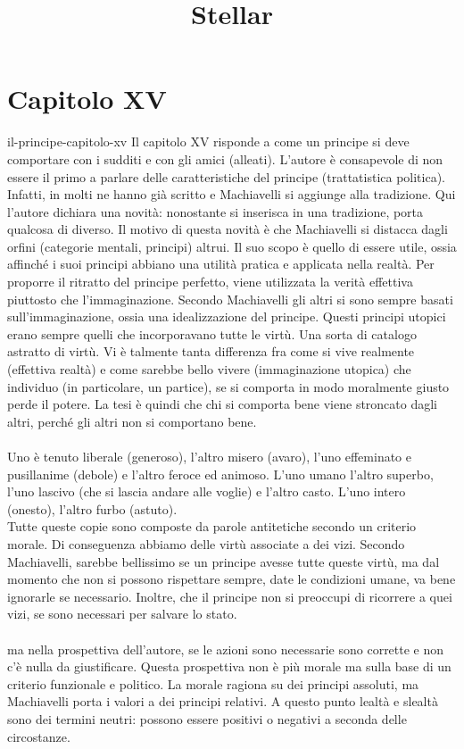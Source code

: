 \documentclass[preview]{standalone}
\begin{document}
\title{Stellar}
\genpage

\section{Capitolo XV}

\begin{snippet}{il-principe-capitolo-xv}
    Il capitolo XV risponde a come un principe si deve comportare
    con i sudditi e con gli amici (alleati).
    L'autore è consapevole di non essere il primo a parlare
    delle caratteristiche del principe (trattatistica politica).
    Infatti, in molti ne hanno già scritto e Machiavelli si
    aggiunge alla tradizione.
    Qui l'autore dichiara una novità: nonostante si inserisca in una tradizione,
    porta qualcosa di diverso.
    Il motivo di questa novità è che Machiavelli si distacca
    dagli orfini (categorie mentali, principi) altrui.
    Il suo scopo è quello di essere utile, ossia
    affinché i suoi principi abbiano una utilità pratica e applicata
    nella realtà.
    Per proporre il ritratto del principe perfetto, viene utilizzata
    la verità effettiva piuttosto che l'immaginazione.
    Secondo Machiavelli gli altri si sono sempre basati sull'immaginazione,
    ossia una idealizzazione del principe.
    Questi principi utopici erano sempre quelli che incorporavano tutte le virtù.
    Una sorta di catalogo astratto di virtù.
    Vi è talmente tanta differenza fra come si vive realmente (effettiva realtà)
    e come sarebbe bello vivere (immaginazione utopica) che
    individuo (in particolare, un partice), se si comporta in modo moralmente giusto
    perde il potere. La tesi è quindi che chi si comporta bene
    viene stroncato dagli altri, perché gli altri non si comportano bene.
    \\\\
    Uno è tenuto liberale (generoso), l'altro misero (avaro),
    l'uno effeminato e pusillanime (debole) e l'altro
    feroce ed animoso. L'uno umano l'altro superbo, l'uno lascivo (che si lascia andare alle voglie) e l'altro casto.
    L'uno intero (onesto), l'altro furbo (astuto).
    \\
    Tutte queste copie sono composte da parole antitetiche
    secondo un criterio morale. Di conseguenza abbiamo delle virtù associate a dei vizi.
    Secondo Machiavelli, sarebbe bellissimo se un principe avesse tutte queste virtù,
    ma dal momento che non si possono rispettare sempre, date le condizioni umane,
    va bene ignorarle se necessario.
    Inoltre, che il principe non si preoccupi di ricorrere a quei vizi,
    se sono necessari per salvare lo stato.
    \\\\
    ma nella prospettiva dell'autore, se le azioni sono necessarie
    sono corrette e non c'è nulla da giustificare.
    Questa prospettiva non è più morale ma sulla base di un criterio funzionale
    e politico.
    La morale ragiona su dei principi assoluti, ma Machiavelli porta i valori a
    dei principi relativi.
    A questo punto lealtà e slealtà sono dei termini neutri:
    possono essere positivi o negativi a seconda delle circostanze.
\end{snippet}
\end{document}
